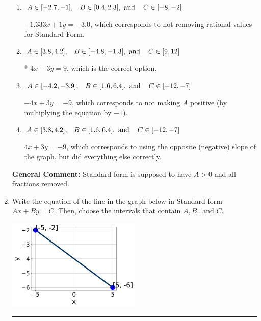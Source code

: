 \documentclass{extbook}[14pt]
\newcommand{\litem}[1]{\item #1

\rule{\textwidth}{0.4pt}}
\begin{document}
\begin{enumerate}
{\begin{enumerate}[label=\Alph*.]
 $-1.333x - 1y = 3.0$, which corresponds to using the opposite (negative) slope of the graph and not removing rational values.
\item \( A \in [-2.7, -1], \hspace{3mm} B \in [0.4, 2.3], \text{ and } \hspace{3mm} C \in [-8, -2] \)

 $-1.333x + 1y = -3.0$, which corresponds to not removing rational values for Standard Form.
\item \( A \in [3.8, 4.2], \hspace{3mm} B \in [-4.8, -1.3], \text{ and } \hspace{3mm} C \in [9, 12] \)

* $4x - 3y = 9$, which is the correct option.
\item \( A \in [-4.2, -3.9], \hspace{3mm} B \in [1.6, 6.4], \text{ and } \hspace{3mm} C \in [-12, -7] \)

 $-4x + 3y = -9$, which corresponds to not making $A$ positive (by multiplying the equation by $-1$).
\item \( A \in [3.8, 4.2], \hspace{3mm} B \in [1.6, 6.4], \text{ and } \hspace{3mm} C \in [-12, -7] \)

 $4x + 3y = -9$, which corresponds to using the opposite (negative) slope of the graph, but did everything else correctly.
\end{enumerate}

\textbf{General Comment:} Standard form is supposed to have $A > 0$ and all fractions removed.
}
\litem{
Write the equation of the line in the graph below in Standard form $Ax+By=C$. Then, choose the intervals that contain $A, B, \text{ and } C$.

\begin{center}
    \includegraphics[width=0.5\textwidth]{../Figures/linearGraphToStandardB.png}
\end{center}


}
\end{enumerate}
\end{document}
